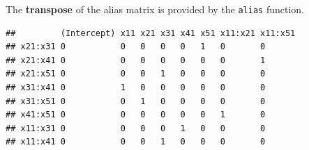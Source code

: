 \documentclass[
  ignorenonframetext,
]{beamer}
\newenvironment{Shaded}{\begin{snugshade}}{\end{snugshade}}
\newcommand{\AttributeTok}[1]{\textcolor[rgb]{0.77,0.63,0.00}{#1}}
\newcommand{\DecValTok}[1]{\textcolor[rgb]{0.00,0.00,0.81}{#1}}
\newcommand{\FunctionTok}[1]{\textcolor[rgb]{0.00,0.00,0.00}{#1}}
\newcommand{\NormalTok}[1]{#1}
\newcommand{\OtherTok}[1]{\textcolor[rgb]{0.56,0.35,0.01}{#1}}
\newcommand{\SpecialCharTok}[1]{\textcolor[rgb]{0.00,0.00,0.00}{#1}}
\begin{document}
\begin{frame}[fragile]{}
\protect\hypertarget{section-15}{}
The \textbf{transpose} of the alias matrix is provided by the
\texttt{alias} function.

\begin{Shaded}
\end{Shaded}

\begin{verbatim}
##         (Intercept) x11 x21 x31 x41 x51 x11:x21 x11:x51
## x21:x31 0           0   0   0   0   1   0       0      
## x21:x41 0           0   0   0   0   0   0       1      
## x21:x51 0           0   0   1   0   0   0       0      
## x31:x41 0           1   0   0   0   0   0       0      
## x31:x51 0           0   1   0   0   0   0       0      
## x41:x51 0           0   0   0   0   0   1       0      
## x11:x31 0           0   0   0   1   0   0       0      
## x11:x41 0           0   0   1   0   0   0       0
\end{verbatim}
\end{frame}
\end{document}
